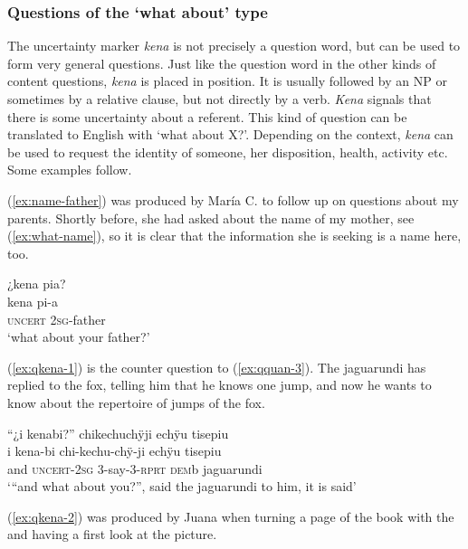 \subsubsection{Questions of the ‘what about’ type}\label{sec:Q_kena}

The uncertainty marker \textit{kena} is not precisely a question word, but can be used to form very general questions. Just like the question word in the other kinds of content questions, \textit{kena} is placed in  position. It is usually followed by an NP or sometimes by a relative clause, but not directly by a verb. \textit{Kena} signals that there is some uncertainty about a referent. This kind of question can be translated to English with ‘what about X?’. Depending on the context, \textit{kena} can be used to request the identity of someone, her disposition, health, activity etc. Some examples follow.

(\ref{ex:name-father}) was produced by María C. to follow up on questions about my parents. Shortly before, she had asked about the name of my mother, see (\ref{ex:what-name}), so it is clear that the information she is seeking is a name here, too.

\ea\label{ex:name-father}
\begingl
\glpreamble ¿kena pia?\\
\gla kena pi-a\\
\glb \textsc{uncert} 2\textsc{sg}-father\\
\glft ‘what about your father?’
\endgl
\trailingcitation{[uxx-p110825l.152]}
\xe

(\ref{ex:qkena-1}) is the counter question to (\ref{ex:qquan-3}). The jaguarundi has replied to the fox, telling him that he knows one jump, and now he wants to know about the repertoire of jumps of the fox.

\ea\label{ex:qkena-1}
\begingl
\glpreamble “¿i kenabi?” chikechuchÿji echÿu tisepiu\\
\gla i kena-bi chi-kechu-chÿ-ji echÿu tisepiu\\
\glb and \textsc{uncert}-2\textsc{sg} 3-say-3-\textsc{rprt} \textsc{dem}b jaguarundi\\
\glft ‘“and what about you?”, said the jaguarundi to him, it is said’
\endgl
\trailingcitation{[jmx-n120429ls-x5.360-361]}
\xe

(\ref{ex:qkena-2}) was produced by Juana when turning a page of the book with the  and having a first look at the picture.

